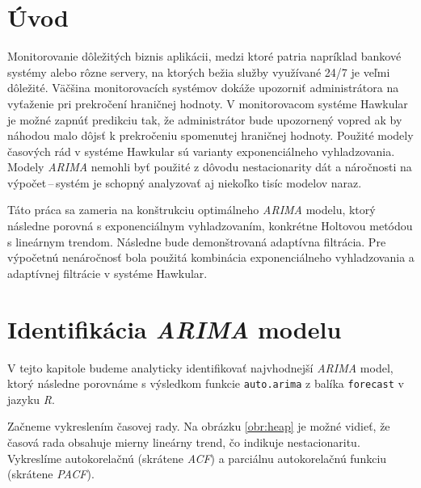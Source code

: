\documentclass[12pt,a4paper,oneside,final]{article}
\theoremstyle{definition}
\theoremstyle{remark}
\numberwithin{equation}{section}
\begin{document}
\VytvorTitulniStranu

\section{Úvod}
Monitorovanie dôležitých biznis aplikácii, medzi ktoré patria napríklad bankové systémy alebo rôzne
servery, na ktorých bežia služby využívané 24/7 je veľmi dôležité. Väčšina
monitorovacích systémov dokáže upozorniť administrátora na vyťaženie pri prekročení
hraničnej hodnoty. V monitorovacom systéme Hawkular je možné zapnúť predikciu tak, že
administrátor bude upozornený vopred ak by náhodou malo dôjsť k prekročeniu spomenutej
hraničnej hodnoty. Použité modely časových rád v systéme Hawkular sú varianty
exponenciálneho vyhladzovania. Modely \emph{ARIMA} nemohli byť použité z dôvodu nestacionarity dát 
a náročnosti na výpočet\,--\,systém je schopný analyzovať aj niekoľko tisíc modelov naraz. 

Táto práca sa zameria na konštrukciu optimálneho \emph{ARIMA} modelu, ktorý následne porovná
s exponenciálnym vyhladzovaním, konkrétne Holtovou metódou s lineárnym trendom. Následne
bude demonštrovaná adaptívna filtrácia. Pre výpočetnú nenáročnosť  bola použitá 
kombinácia exponenciálneho vyhladzovania a
adaptívnej filtrácie v systéme Hawkular.


\section{Identifikácia \emph{ARIMA} modelu}
V tejto kapitole budeme analyticky identifikovať najvhodnejší \emph{ARIMA} model, ktorý následne 
porovnáme s výsledkom funkcie \texttt{auto.arima} z balíka \texttt{forecast} v jazyku
\emph{R}.

Začneme vykreslením časovej rady. Na obrázku \ref{obr:heap} je možné vidieť, že časová rada 
obsahuje mierny lineárny trend, čo indikuje nestacionaritu. Vykreslíme autokorelačnú 
(skrátene \emph{ACF}) a parciálnu autokorelačnú funkciu (skrátene \emph{PACF}).
\end{document}
